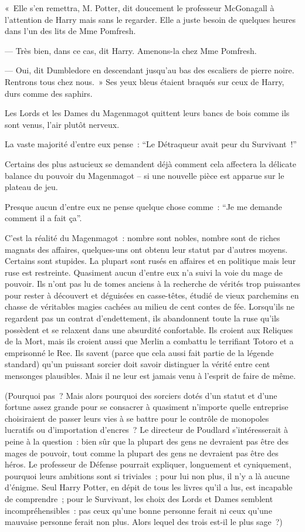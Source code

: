 «~Elle s'en remettra, M. Potter, dit doucement le professeur McGonagall à l'attention de Harry mais sans le regarder. Elle a juste besoin de quelques heures dans l'un des lits de Mme Pomfresh.

--- Très bien, dans ce cas, dit Harry. Amenons-la chez Mme Pomfresh.

--- Oui, dit Dumbledore en descendant jusqu'au bas des escaliers de pierre noire. Rentrons tous chez nous.~» Ses yeux bleus étaient braqués sur ceux de Harry, durs comme des saphirs.

\later

Les Lords et les Dames du Magenmagot quittent leurs bancs de bois comme ils sont venus, l'air plutôt nerveux.

La vaste majorité d'entre eux pense~: “Le Détraqueur avait peur du Survivant~!”

Certains des plus astucieux se demandent déjà comment cela affectera la délicate balance du pouvoir du Magenmagot -- si une nouvelle pièce est apparue sur le plateau de jeu.

Presque aucun d'entre eux ne pense quelque chose comme~: “Je me demande comment il a fait ça”.

C'est la réalité du Magenmagot~: nombre sont nobles, nombre sont de riches magnats des affaires, quelques-uns ont obtenu leur statut par d'autres moyens. Certains sont stupides. La plupart sont rusés en affaires et en politique mais leur ruse est restreinte. Quasiment aucun d'entre eux n'a suivi la voie du mage de pouvoir. Ils n'ont pas lu de tomes anciens à la recherche de vérités trop puissantes pour rester à découvert et déguisées en casse-têtes, étudié de vieux parchemins en chasse de véritables magies cachées au milieu de cent contes de fée. Lorsqu'ils ne regardent pas un contrat d'endettement, ils abandonnent toute la ruse qu'ils possèdent et se relaxent dans une absurdité confortable. Ils croient aux Reliques de la Mort, mais ils croient aussi que Merlin a combattu le terrifiant Totoro et a emprisonné le Ree. Ils savent (parce que cela aussi fait partie de la légende standard) qu'un puissant sorcier doit savoir distinguer la vérité entre cent mensonges plausibles. Mais il ne leur est jamais venu à l'esprit de faire de même.

(Pourquoi pas~? Mais alors pourquoi des sorciers dotés d'un statut et d'une fortune assez grande pour se consacrer à quasiment n'importe quelle entreprise choisiraient de passer leurs vies à se battre pour le contrôle de monopoles lucratifs ou d'importation d'encres~? Le directeur de Poudlard s'intéresserait à peine à la question~: bien sûr que la plupart des gens ne devraient pas être des mages de pouvoir, tout comme la plupart des gens ne devraient pas être des héros. Le professeur de Défense pourrait expliquer, longuement et cyniquement, pourquoi leurs ambitions sont si triviales~; pour lui non plus, il n'y a là aucune d'énigme. Seul Harry Potter, en dépit de tous les livres qu'il a lus, est incapable de comprendre~; pour le Survivant, les choix des Lords et Dames semblent incompréhensibles~: pas ceux qu'une bonne personne ferait ni ceux qu'une mauvaise personne ferait non plus. Alors lequel des trois est-il le plus sage~?)

